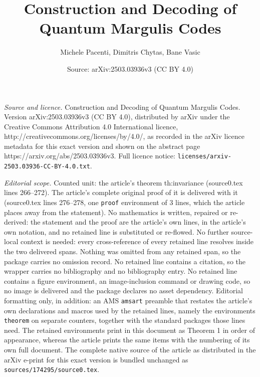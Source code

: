 \documentclass[10pt,a4paper]{amsart}
\title{Construction and Decoding of Quantum Margulis Codes}
\author{Michele Pacenti, Dimitris Chytas, Bane Vasic}
\date{Source: arXiv:2503.03936v3 (CC BY 4.0)}
\begin{document}
\maketitle

\noindent\emph{Source and licence.} Construction and Decoding of Quantum Margulis Codes. Version arXiv:2503.03936v3 (CC BY 4.0), distributed by arXiv under the Creative Commons Attribution 4.0 International licence, http://creativecommons.org/licenses/by/4.0/, as recorded in the arXiv licence metadata for this exact version and shown on the abstract page https://arxiv.org/abs/2503.03936v3. Full licence notice: \texttt{licenses/arxiv-2503.03936-CC-BY-4.0.txt}.\par\smallskip

\noindent\textit{Editorial scope.} Counted unit: the article's theorem th:invariance (source0.tex lines 266--272). The article's complete original proof of it is delivered with it (source0.tex lines 276--278, one \texttt{proof} environment of 3 lines, which the article places away from the statement). No mathematics is written, repaired or re-derived: the statement and the proof are the article's own lines, in the article's own notation, and no retained line is substituted or re-flowed.  No further source-local context is needed: every cross-reference of every retained line resolves inside the two delivered spans.  Nothing was omitted from any retained span, so the package carries no omission record.  No retained line contains a citation, so the wrapper carries no bibliography and no bibliography entry.  No retained line contains a figure environment, an image-inclusion command or drawing code, so no image is delivered and the package declares no asset dependency.  Editorial formatting only, in addition: an AMS \texttt{amsart} preamble that restates the article's own declarations and macros used by the retained lines, namely the environments \texttt{theorem} on separate counters, together with the standard packages those lines need.  The retained environments print in this document as Theorem 1 in order of appearance, whereas the article prints the same items with the numbering of its own full document.  The complete native source of the article as distributed in the arXiv e-print for this exact version is bundled unchanged as \texttt{sources/174295/source0.tex}.
\end{document}
